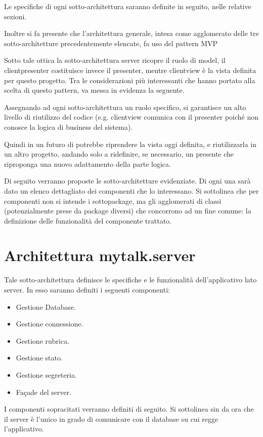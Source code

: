 Le specifiche di ogni sotto-architettura saranno definite in seguito, nelle relative sezioni.

Inoltre si fa presente che l'architettura generale, intesa come agglomerato delle tre sotto-architetture precedentemente elencate, fa uso del pattern MVP\@

Sotto tale ottica la sotto-architettura server ricopre il ruolo di model, il clientpresenter costituisce invece il presenter, mentre clientview è la vista definita per questo progetto. Tra le considerazioni più interessanti che hanno portato alla scelta di questo pattern, va messa in evidenza la seguente.

Assegnando ad ogni sotto-architettura un ruolo specifico, si garantisce un alto livello di riutilizzo del codice (e.g. clientview comunica con il presenter poiché non conosce la logica di business del sistema).

Quindi in un futuro di potrebbe riprendere la vista oggi definita, e riutilizzarla in un altro progetto, andando solo a ridefinire, se necessario, un presente che riproponga una nuovo adattamento della parte logica.

Di seguito verranno proposte le sotto-architetture evidenziate. Di ogni una sarà dato un elenco dettagliato dei componenti che lo interessano. Si sottolinea che per componenti non si intende i sottopackage, ma gli agglomerati di classi (potenzialmente prese da package diversi) che concorrono ad un fine comune: la definizione delle funzionalità del componente trattato.
\clearpage

\section{Architettura mytalk.server}
Tale sotto-architettura definisce le specifiche e le funzionalità dell'applicativo lato server. In esso saranno definiti i seguenti componenti:
\begin{itemize}[noitemsep,nolistsep]
	\item Gestione Database.
	\item Gestione connessione.
	\item Gestione rubrica.
	\item Gestione stato.
	\item Gestione segreteria.
	\item Façade del server.
\end{itemize}

I componenti sopracitati verranno definiti di seguito. Si sottolinea sin da ora che il server è l'unico in grado di comunicare con il database su cui regge l'applicativo.

